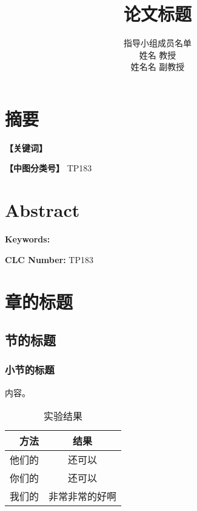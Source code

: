 \documentclass[12pt,a4paper,oneside,openany]{book}
\title{论文标题}
\author{
指导小组成员名单\vspace{1em}\\
姓\hspace{1em}名 \hspace{1em} 教\hspace{1em}授\\
姓名名 \hspace{1em} 副教授\\
}
\date{}
\begin{document}


\maketitle

\tableofcontents

\frontmatter

\chapter{摘\hspace{1.5em}要}

\textbf{【关键词】}

\textbf{【中图分类号】} TP183

\chapter{Abstract}

\textbf{Keywords:}

\textbf{CLC Number:} TP183

\mainmatter

\chapter{章的标题}

\section{节的标题}

\subsection{小节的标题}

内容。

\begin{table}[!h]
\begin{center}
\begin{tabular}{r|c}
\hline\hline
方法 & 结果 \\
\hline
他们的 & 还可以 \\
你们的 & 还可以 \\
我们的 & 非常非常的好啊 \\
\hline\hline
\end{tabular}
\end{center}
\caption{实验结果}
\end{table}
\end{document}
